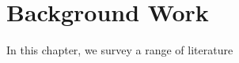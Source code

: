 \chapter{Background Work}
\label{ch:background_work}

In this chapter, we survey a range of literature 







